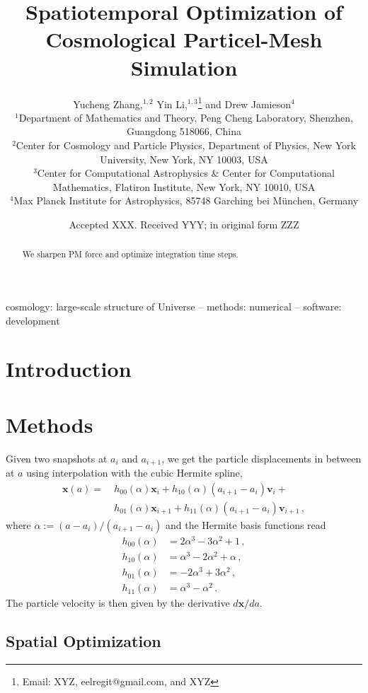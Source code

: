 \documentclass[usenatbib]{mnras}
\title[Spatiotemporally Optimized Simulation]
{Spatiotemporal Optimization of Cosmological Particel-Mesh Simulation}
\author[Zhang, Li, Jamieson, et al.]{
%
Yucheng Zhang,$^{1, 2}$
%
Yin Li,$^{1, 3}$\thanks{Email: XYZ, eelregit@gmail.com, and XYZ}
%
and Drew Jamieson$^{4}$
%
\\$^1$Department of Mathematics and Theory, Peng Cheng Laboratory,
Shenzhen, Guangdong 518066, China
%
\\$^2$Center for Cosmology and Particle Physics, Department of Physics,
New York University, New York, NY 10003, USA
%
\\$^3$Center for Computational Astrophysics \& Center for Computational
Mathematics, Flatiron Institute, New York, NY 10010, USA
%
\\$^4$Max Planck Institute for Astrophysics, 85748 Garching bei
M\"unchen, Germany
}
\date{Accepted XXX. Received YYY; in original form ZZZ}
\begin{document}
\label{firstpage}
\pagerange{\pageref{firstpage}--\pageref{lastpage}}
\maketitle



\begin{abstract}
We sharpen PM force and optimize integration time steps.
\end{abstract}

\begin{keywords}
cosmology: large-scale structure of Universe
-- methods: numerical
-- software: development
\end{keywords}



\section{Introduction}


\section{Methods}


Given two snapshots at $a_i$ and $a_{i+1}$, we get the particle displacements
in between at $a$ using interpolation with the cubic Hermite spline,
\begin{align}
  \bm{x}(a) =\ &h_{00}(\alpha)\bm{x}_i + h_{10}(\alpha)(a_{i+1} - a_i)\bm{v}_i + \nonumber\\
           &h_{01}(\alpha)\bm{x}_{i+1} + h_{11}(\alpha)(a_{i+1} - a_i)\bm{v}_{i+1} \,,
\end{align}
where $\alpha := (a - a_i)/(a_{i+1} - a_i)$ and the Hermite basis functions read
\begin{align}
  h_{00}(\alpha) &= 2\alpha^3 - 3\alpha^2 + 1 \,,\nonumber\\
  h_{10}(\alpha) &= \alpha^3 - 2\alpha^2 + \alpha \,,\nonumber\\
  h_{01}(\alpha) &= -2\alpha^3 + 3\alpha^2 \,,\nonumber\\
  h_{11}(\alpha) &= \alpha^3 - \alpha^2 \,.
\end{align}
The particle velocity is then given by the derivative $d\bm{x}/da$.


\subsection{Spatial Optimization}
\end{document}
